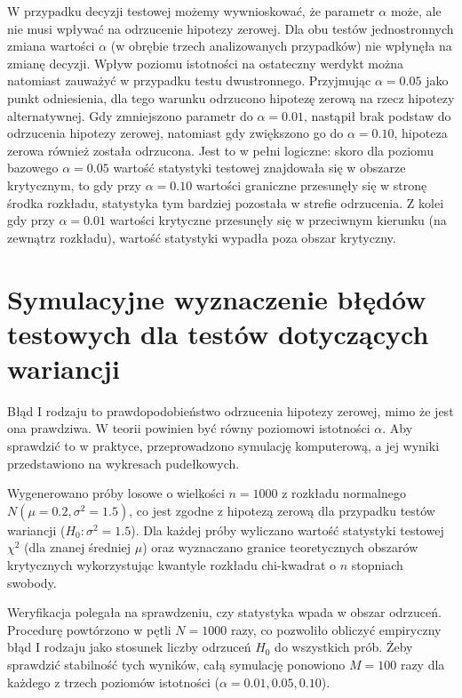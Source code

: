 \documentclass[12pt, a4paper]{article}
\begin{document}
		W przypadku decyzji testowej możemy wywnioskować, że parametr $\alpha$ może, ale nie musi wpływać na odrzucenie hipotezy zerowej. Dla obu testów jednostronnych zmiana wartości $\alpha$ (w obrębie trzech analizowanych przypadków) nie wpłynęła na zmianę decyzji. Wpływ poziomu istotności na ostateczny werdykt można natomiast zauważyć w przypadku testu dwustronnego. Przyjmując $\alpha=0.05$ jako punkt odniesienia, dla tego warunku odrzucono hipotezę zerową na rzecz hipotezy alternatywnej. Gdy zmniejszono parametr do $\alpha = 0.01$, nastąpił brak podstaw do odrzucenia hipotezy zerowej, natomiast gdy zwiększono go do $\alpha = 0.10$, hipoteza zerowa również została odrzucona. Jest to w pełni logiczne: skoro dla poziomu bazowego $\alpha=0.05$ wartość statystyki testowej znajdowała się w obszarze krytycznym, to gdy przy $\alpha=0.10$ wartości graniczne przesunęły się w stronę środka rozkładu, statystyka tym bardziej pozostała w strefie odrzucenia. Z kolei gdy przy $\alpha=0.01$ wartości krytyczne przesunęły się w przeciwnym kierunku (na zewnątrz rozkładu), wartość statystyki wypadła poza obszar krytyczny.

	\section{Symulacyjne wyznaczenie błędów testowych dla testów dotyczących wariancji }
		Błąd I rodzaju to prawdopodobieństwo odrzucenia hipotezy zerowej, mimo że jest ona prawdziwa. W teorii powinien być równy poziomowi istotności $\alpha$. Aby sprawdzić to w praktyce, przeprowadzono symulację komputerową, a jej wyniki przedstawiono na wykresach pudełkowych.
		
		Wygenerowano próby losowe o wielkości $n = 1000$ z rozkładu normalnego $N(\mu = 0.2, \sigma^2 = 1.5)$, co jest zgodne z hipotezą zerową dla przypadku testów wariancji ($H_0: \sigma^2 = 1.5$). Dla każdej próby wyliczano wartość statystyki testowej $\chi^2$ (dla znanej średniej $\mu$) oraz wyznaczano granice teoretycznych obszarów krytycznych wykorzystując kwantyle rozkładu chi-kwadrat o $n$ stopniach swobody.
		
		Weryfikacja polegała na sprawdzeniu, czy statystyka wpada w obszar odrzuceń. Procedurę powtórzono w pętli $N = 1000$ razy, co pozwoliło obliczyć empiryczny błąd I rodzaju jako stosunek liczby odrzuceń $H_0$ do wszystkich prób. Żeby sprawdzić stabilność tych wyników, całą symulację ponowiono $M = 100$ razy dla każdego z trzech poziomów istotności ($\alpha = 0.01, 0.05, 0.10$).
		
\end{document}
